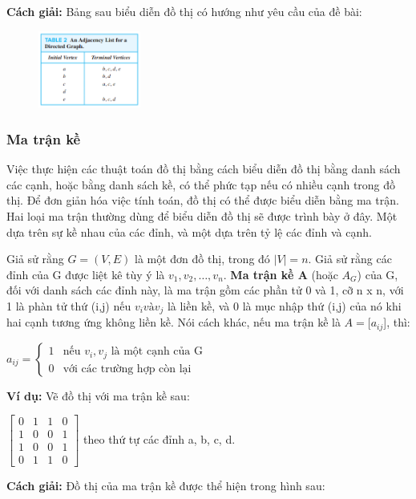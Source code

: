 \textbf{Cách giải:} Bảng sau biểu diễn đồ thị có hướng như yêu cầu của đề bài:
\begin{figure}[H] %
    \centering %
    \includegraphics[width=0.3\textwidth]{assets/pic2.1.png} 
    \label{fig:gr_01}
\end{figure}


\subsubsection{Ma trận kề}
Việc thực hiện các thuật toán đồ thị bằng cách biểu diễn đồ thị bằng danh sách các cạnh, hoặc bằng danh sách kề, có thể phức tạp nếu có nhiều cạnh trong đồ thị. Để đơn giản hóa việc tính toán, đồ thị có thể được biểu diễn bằng ma trận. Hai loại ma trận thường dùng để biểu diễn đồ thị sẽ được trình bày ở đây. Một dựa trên sự kề nhau của các đỉnh, và một dựa trên tỷ lệ các đỉnh và cạnh.

Giả sử rằng $G = (V, E)$ là một đơn đồ thị, trong đó $|V| = n$. Giả sử rằng các đỉnh của G được liệt kê tùy ý là $v_1, v_2,…, v_n$. \textbf{Ma trận kề A} (hoặc $A_G$) của G, đối với danh sách các đỉnh này, là ma trận gồm các phần tử 0 và 1, cỡ n x n, với 1 là phàn tử thứ (i,j) nếu $v_i và v_j$ là liền kề, và 0 là mục nhập thứ (i,j) của nó khi hai cạnh tương ứng không liền kề. Nói cách khác, nếu ma trận kề là $A = [a_{ij}$], thì:

$
a_{ij} = \left\{ \begin{array}{lcr}
1 & \text{nếu ${v_i, v_j}$ là một cạnh của G}\\
0 & \text{với các trường hợp còn lại}
\end{array} \right.
$


\textbf{Ví dụ:}
Vẽ đồ thị với ma trận kề sau:

$
\begin{bmatrix}
    0&1&1&0\\
    1&0&0&1\\
    1&0&0&1\\
    0&1&1&0
\end{bmatrix}
$
theo thứ tự các đỉnh a, b, c, d.

\textbf{Cách giải:}
Đồ thị của ma trận kề được thể hiện trong hình sau:


